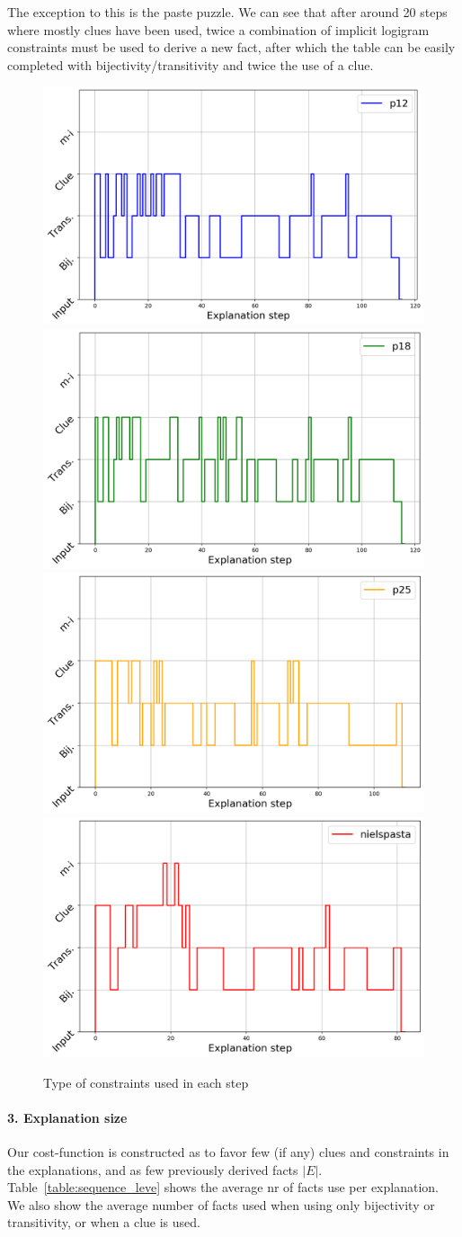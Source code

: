 The exception to this is the paste puzzle. We can see that after around 20 steps where mostly clues have been used, twice a combination of implicit logigram constraints must be used to derive a new fact, after which the table can be easily completed with bijectivity/transitivity and twice the use of a clue.

\begin{figure}[t]
\centering
\includegraphics[width=0.49\linewidth]{figures/plot_cost_steps_p12}
\includegraphics[width=0.49\linewidth]{figures/plot_cost_steps_p18}
\includegraphics[width=0.49\linewidth]{figures/plot_cost_steps_p25}
\includegraphics[width=0.49\linewidth]{figures/plot_cost_steps_nielspasta}
\caption{Type of constraints used in each step}
\label{fig:steps}
\end{figure}

\paragraph{3. Explanation size}
Our cost-function is constructed as to favor few (if any) clues and constraints in the explanations, and as few previously derived facts $|E|$. Table~\ref{table:sequence_leve} shows the average nr of facts use per explanation. We also show the average number of facts used when using only bijectivity or transitivity, or when a clue is used.

